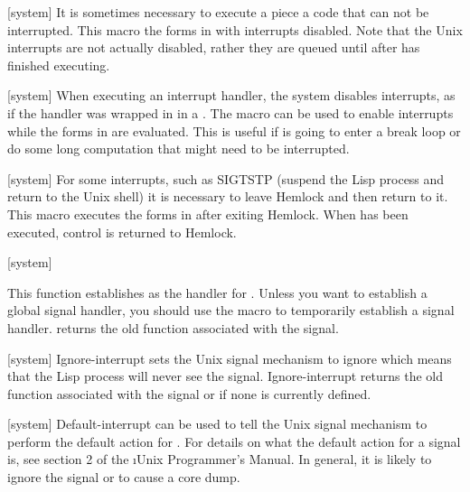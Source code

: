 {[system]{}
It is sometimes necessary to execute a piece a code that can not be
interrupted.  This macro the forms in  with interrupts disabled.  Note
that the Unix interrupts are not actually disabled, rather they are queued
until after  has finished executing.
\enddefmac

[system]{}
When executing an interrupt handler, the system disables interrupts, as if the
handler was wrapped in in a .  The macro
 can be used to enable interrupts while the forms in
 are evaluated.  This is useful if  is going to enter a break
loop or do some long computation that might need to be interrupted.
\enddefmac

[system]{}
For some interrupts, such as SIGTSTP (suspend the Lisp process and return
to the Unix shell) it is necessary to leave Hemlock and then return to it.
This macro executes the forms in  after exiting Hemlock.  When
 has been executed, control is returned to Hemlock.
\enddefmac

[system]{
       } 

This function establishes  as the handler for .
  Unless you want to establish a global signal
handler, you should use the macro  to temporarily
establish a signal handler.  
 returns the old function associated with the signal.
\enddefun

[system]{}
Ignore-interrupt sets the Unix signal mechanism to ignore 
which means that the Lisp process will never see the signal.
Ignore-interrupt returns the old function associated with the signal or \false{}
if none is currently defined.
\enddefun

[system]{}
Default-interrupt can be used to tell the Unix signal mechanism to perform
the default action for .  For details on what the default action
for a signal is, see section 2 of the \i{Unix Programmer's Manual}.  In
general, it is likely to ignore the signal or to cause a core dump.
\enddefun

}
